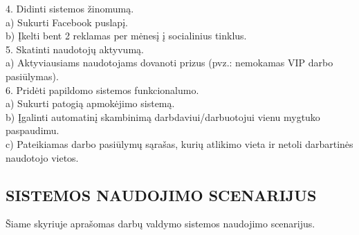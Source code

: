 \documentclass{VUMIFPSkursinis}
\begin{document}
\hspace*{1cm}4. Didinti sistemos žinomumą.\\
\hspace*{2cm} a) Sukurti Facebook puslapį.\\
\hspace*{2cm} b) Įkelti bent 2 reklamas per mėnesį į socialinius tinklus.\\ \newline
\hspace*{1cm}5. Skatinti naudotojų aktyvumą.\\
\hspace*{2cm} a) Aktyviausiams naudotojams dovanoti prizus (pvz.: nemokamas VIP darbo pasiūlymas).\\ \newline
\hspace*{1cm}6. Pridėti papildomo sistemos funkcionalumo.\\
\hspace*{2cm} a) Sukurti patogią apmokėjimo sistemą.\\
\hspace*{2cm} b) Įgalinti automatinį skambinimą darbdaviui/darbuotojui vienu mygtuko paspaudimu.\\
\hspace*{2cm} c) Pateikiamas darbo pasiūlymų sąrašas, kurių atlikimo vieta ir netoli darbartinės naudotojo vietos.\\

\newpage
\subsection{SISTEMOS NAUDOJIMO SCENARIJUS}
Šiame skyriuje aprašomas darbų valdymo sistemos naudojimo scenarijus.
\end{document}
